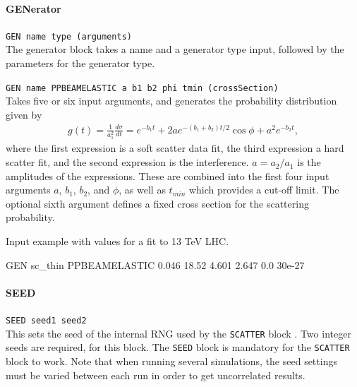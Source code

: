 \paragraph{GENerator} \texttt{GEN name type (arguments)} \\

The generator block takes a name and a generator type input, followed by the parameters for the
generator type.

\bigskip
\noindent\texttt{GEN name PPBEAMELASTIC a b1 b2 phi tmin (crossSection)} \\

Takes five or six input arguments, and generates the probability distribution given by
\begin{align}
    g(t) = \frac{1}{a_1^2}\frac{d\sigma}{dt} = e^{-b_1 t}+ 2ae^{-(b_1+b_2)t/2}\cos{\phi} + a^2e^{-b_2 t},
\end{align}
where the first expression is a soft scatter data fit, the third expression a hard scatter fit, and the second expression is the interference. $a = a_2/a_1$ is the amplitudes of the expressions. These are combined into the first four input arguments $a$, $b_1$, $b_2$, and $\phi$, as well as $t_{min}$ which provides a cut-off limit.
The optional sixth argument defines a fixed cross section for the scattering probability.

Input example with values for a fit to 13 TeV LHC.
\begin{cverbatim}
GEN  sc_thin     PPBEAMELASTIC 0.046 18.52 4.601 2.647 0.0 30e-27
\end{cverbatim}

\paragraph{SEED} \texttt{SEED seed1 seed2}\\

This sets the seed of the internal RNG used by the \texttt{SCATTER} block \cite{RANECU}.
Two integer seeds are required, for this block.
The \texttt{SEED} block is mandatory for the \texttt{SCATTER} block to work.
Note that when running several simulations, the seed settings must be varied between each run in order to get uncorrelated results.
